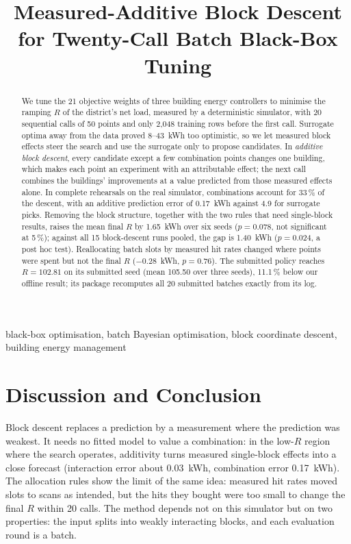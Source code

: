 \documentclass[conference]{IEEEtran}
\title{Measured-Additive Block Descent for Twenty-Call Batch Black-Box Tuning}
\author{\IEEEauthorblockN{Zimu Zhang, Runze Liu, Ziqi Ai, Xinlan Hu, Yunyang Wu}
\IEEEauthorblockA{SDM374 Machine Learning System Design, Southern University of Science and Technology}}
\begin{document}
\maketitle

\begin{abstract}
We tune the 21 objective weights of three building energy controllers to minimise the ramping $R$ of the
district's net load, measured by a deterministic simulator, with 20 sequential calls of 50 points and only 2,048
training rows before the first call. Surrogate optima away from the data proved 8--43~kWh too optimistic, so we let
measured block effects steer the search and use the surrogate only to propose candidates. In \emph{additive block
descent}, every candidate except a few combination points changes one building, which makes each point an
experiment with an attributable effect; the next call combines the buildings' improvements at a value predicted
from those measured effects alone. In complete rehearsals on the real simulator, combinations account for 33\,\% of
the descent, with an additive prediction error of 0.17~kWh against 4.9 for surrogate picks. Removing the block
structure, together with the two rules that need single-block results, raises the mean final $R$ by 1.65~kWh over
six seeds ($p=0.078$, not significant at 5\,\%); against all 15 block-descent runs pooled, the gap is 1.40~kWh
($p=0.024$, a post hoc test). Reallocating batch slots by measured hit rates changed where points were spent but not
the final $R$ ($-0.28$~kWh, $p=0.76$). The submitted policy reaches $R=102.81$ on its submitted seed (mean 105.50 over
three seeds), 11.1\,\% below our offline result; its package recomputes all 20 submitted batches exactly from its log.
\end{abstract}

\begin{IEEEkeywords}
black-box optimisation, batch Bayesian optimisation, block coordinate descent, building energy management
\end{IEEEkeywords}






\section{Discussion and Conclusion}
\label{sec:discussion}
Block descent replaces a prediction by a measurement where the prediction was weakest. It needs no fitted model to
value a combination: in the low-$R$ region where the search operates, additivity turns measured single-block effects
into a close forecast (interaction error about 0.03~kWh, combination error 0.17~kWh). The allocation rules show the
limit of the same idea: measured hit rates moved slots to scans as intended, but the hits they bought were too small
to change the final $R$ within 20 calls. The method depends not on this simulator but on two properties: the input
splits into weakly interacting blocks, and each evaluation round is a batch.
\end{document}
